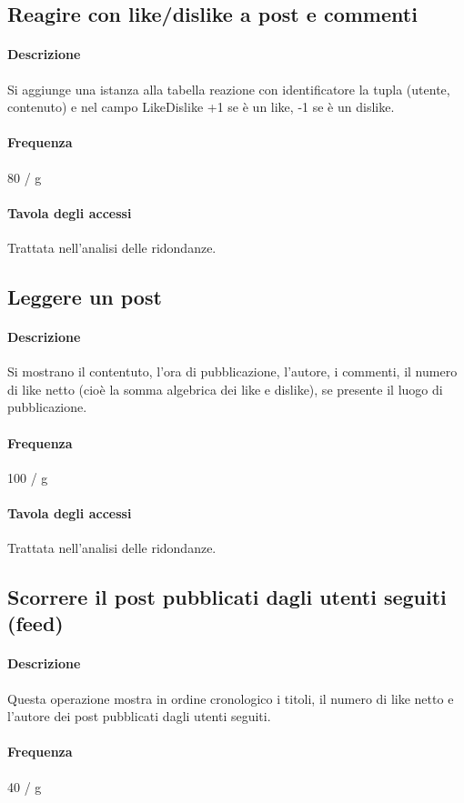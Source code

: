 \documentclass[a4paper,12pt]{report}
\begin{document}
\subsection{Reagire con like/dislike a post e commenti} \label{like}
\paragraph{Descrizione} Si aggiunge una istanza alla tabella reazione con identificatore la tupla (utente, contenuto) e nel campo LikeDislike +1 se è un like, -1 se è un dislike.
\paragraph{Frequenza} 80 / g
\paragraph{Tavola degli accessi}  
Trattata nell'analisi delle ridondanze.
\subsection{Leggere un post} \label{leggere_post}
\paragraph{Descrizione} Si mostrano il contentuto, l'ora di pubblicazione, l'autore, i commenti, il numero di like netto (cioè la somma algebrica dei like e dislike), se presente il luogo di pubblicazione.
\paragraph{Frequenza} 100 / g
\paragraph{Tavola degli accessi}  
Trattata nell'analisi delle ridondanze.
\subsection{Scorrere il post pubblicati dagli utenti seguiti (feed)} \label{feed}
\paragraph{Descrizione} Questa operazione mostra in ordine cronologico i titoli, il numero di like netto e l'autore dei post pubblicati dagli utenti seguiti.
\paragraph{Frequenza} 40 / g
\end{document}
